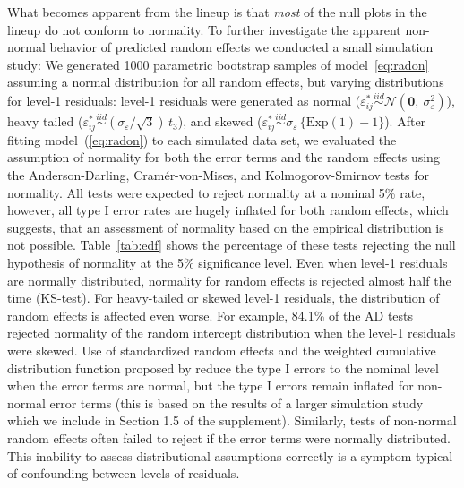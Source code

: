 \documentclass[12pt]{article} %
\newcommand{\hh}[1]{{\color{orange} #1}}
\newcommand{\al}[1]{{\color{red} #1}}
\begin{document}
What becomes apparent from the lineup is that {\it most} of the null plots in the lineup do not conform to normality. To further investigate the apparent non-normal behavior of predicted random effects we conducted a small simulation study: 
%
We generated 1000 parametric bootstrap samples of model~\eqref{eq:radon} assuming \hh{a normal distribution for all random effects, but  varying distributions for  level-1 residuals: } level-1 residuals were generated as normal ($\varepsilon_{ij}^* \overset{iid}{\sim}  \mathcal{N}(\bm{0},\ \sigma^2_\varepsilon)$), heavy tailed ($\varepsilon_{ij}^* \overset{iid}{\sim} (\sigma_{\varepsilon} / \sqrt{3})\, t_3$), and skewed ($\varepsilon_{ij}^* \overset{iid}{\sim} \sigma_{\varepsilon} \, \{ \text{Exp}(1) - 1 \}$).
After fitting model~(\ref{eq:radon}) to each simulated data set, we evaluated the assumption of normality for both the error terms and 
the random effects using the Anderson-Darling, Cram{\'e}r-von-Mises, and  Kolmogorov-Smirnov tests for normality.  All tests were expected to reject normality at a nominal 5\% rate, however, all type I error rates are hugely inflated for both random effects, which suggests, that  an assessment of normality based on the empirical distribution is not possible. 
%
Table~\ref{tab:edf} shows the percentage of these tests rejecting the null hypothesis of normality at the 5\% significance level.
Even when level-1 residuals are normally distributed, normality for random effects is rejected almost half the time (KS-test). For heavy-tailed or skewed level-1 residuals, the distribution of random effects is affected even worse. 
%
For example, 84.1\% of the AD tests rejected normality of the random intercept distribution when the level-1 residuals were skewed.
 Use of standardized random effects and the weighted cumulative distribution function proposed by \cite{Lange:1989uu} reduce the type I errors to the nominal level when the error terms are normal, but the type I errors remain inflated for non-normal error terms \al{(this is based on the results of a larger simulation study which we include in Section 1.5 of the supplement)}.  
Similarly, tests of non-normal random effects often failed to reject if the error terms were normally distributed. %
This inability to assess distributional assumptions correctly is a symptom typical of confounding between levels of residuals.
\end{document}
